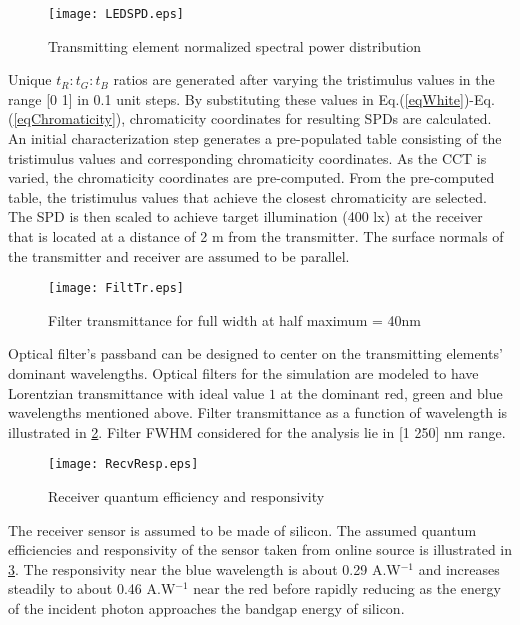 \begin{figure}[!t]
	\centering
		\texttt{[image: LEDSPD.eps]}
	\caption{Transmitting element normalized spectral power distribution}
	\label{fig:LEDSPD}
\end{figure}

Unique $t_R:t_G:t_B$ ratios are generated after varying the tristimulus values in the range [0 1] in 0.1 unit steps. By substituting these values in Eq.(\ref{eqWhite})-Eq.(\ref{eqChromaticity}), chromaticity coordinates for resulting SPDs are calculated. An initial characterization step generates a pre-populated table consisting of the tristimulus values and corresponding chromaticity coordinates. As the CCT is varied, the chromaticity coordinates are pre-computed. From the pre-computed table, the tristimulus values that achieve the closest chromaticity are selected. The SPD is then scaled to achieve target illumination (400 lx) at the receiver that is located at a distance of 2 m from the transmitter. The surface normals of the transmitter and receiver are assumed to be parallel.

\begin{figure}[!b]
	\centering
		\texttt{[image: FiltTr.eps]}
	\caption{Filter transmittance for full width at half maximum = 40nm}
	\label{fig:FiltTr}
\end{figure}

Optical filter's passband can be designed to center on the transmitting elements' dominant wavelengths. Optical filters for the simulation are modeled to have Lorentzian transmittance with ideal value $1$ at the dominant red, green and blue wavelengths mentioned above. Filter transmittance as a function of wavelength is illustrated in \figurename{\ref{fig:FiltTr}}. Filter FWHM considered for the analysis lie in [1 250] nm range.

\begin{figure}[!t]
	\centering
		\texttt{[image: RecvResp.eps]}
	\caption{Receiver quantum efficiency and responsivity}
	\label{fig:RecvResp}
\end{figure}
The receiver sensor is assumed to be made of silicon. The assumed quantum efficiencies and responsivity of the sensor taken from online source is illustrated in \figurename{\ref{fig:RecvResp}}. The responsivity near the blue wavelength is about 0.29 A.W$^{-1}$ and increases steadily to about 0.46 A.W$^{-1}$ near the red before rapidly reducing as the energy of the incident photon approaches the bandgap energy of silicon.

